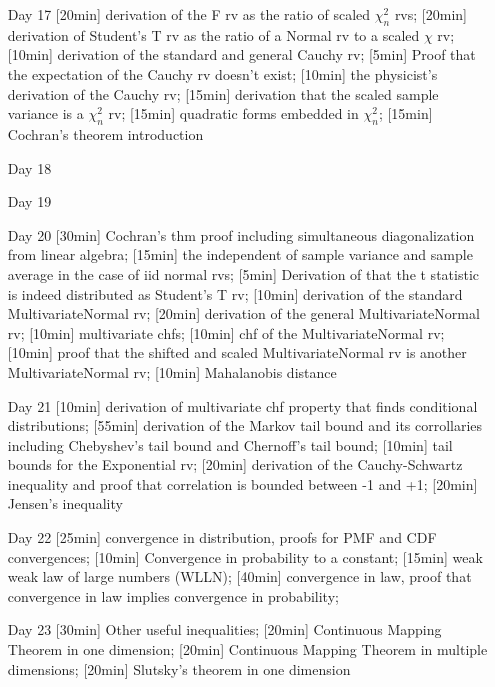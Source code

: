 \begin{enumerate}
\item[Day 17] [20min] derivation of the F rv as the ratio of scaled $\chi^2_n$ rvs; [20min] derivation of Student's T rv as the ratio of a Normal rv to a scaled $\chi$ rv; [10min] derivation of the standard and general Cauchy rv; [5min] Proof that the expectation of the Cauchy rv doesn't exist; [10min] the physicist's derivation of the Cauchy rv; [15min] derivation that the scaled sample variance is a $\chi^2_n$ rv; [15min] quadratic forms embedded in $\chi^2_n$; [15min] Cochran's theorem introduction


\item[Day 18] 
\item[Day 19] 


\item[Day 20] [30min] Cochran's thm proof including simultaneous diagonalization from linear algebra; [15min] the independent of sample variance and sample average in the case of iid normal rvs; [5min] Derivation of that the t statistic is indeed distributed as Student's T rv; [10min] derivation of the standard MultivariateNormal rv; [20min] derivation of the general MultivariateNormal rv; [10min] multivariate chfs; [10min] chf of the MultivariateNormal rv; [10min] proof that the shifted and scaled MultivariateNormal rv is another MultivariateNormal rv; [10min] Mahalanobis distance

\item[Day 21] [10min] derivation of multivariate chf property that finds conditional distributions; [55min] derivation of the Markov tail bound and its corrollaries including Chebyshev's tail bound and Chernoff's tail bound; [10min] tail bounds for the Exponential rv; [20min] derivation of the Cauchy-Schwartz inequality and proof that correlation is bounded between -1 and +1; [20min] Jensen's inequality

\item[Day 22] [25min] convergence in distribution, proofs for PMF and CDF convergences; [10min] Convergence in probability to a constant; [15min] weak weak law of large numbers (WLLN); [40min] convergence in law, proof that convergence in law implies convergence in probability; 

\item[Day 23] [30min] Other useful inequalities; [20min] Continuous Mapping Theorem in one dimension; [20min] Continuous Mapping Theorem in multiple dimensions; [20min] Slutsky's theorem in one dimension


\end{enumerate}
